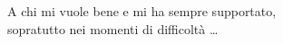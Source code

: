 {\calligra A chi mi vuole bene e mi ha sempre supportato, \\ sopratutto nei momenti di difficoltà \ldots{}}


